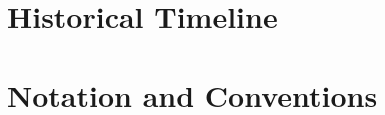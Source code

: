 \documentclass[12pt,a4paper,twoside]{book}
\theoremstyle{plain}
\theoremstyle{definition}
\theoremstyle{remark}
\begin{document}
\chapter{Historical Timeline}
\label{app:timeline}


\chapter{Notation and Conventions}
\label{app:notation}


\backmatter

\nocite{*}

\printbibliography[heading=bibintoc,title={Bibliography}]

\printindex
\end{document}
